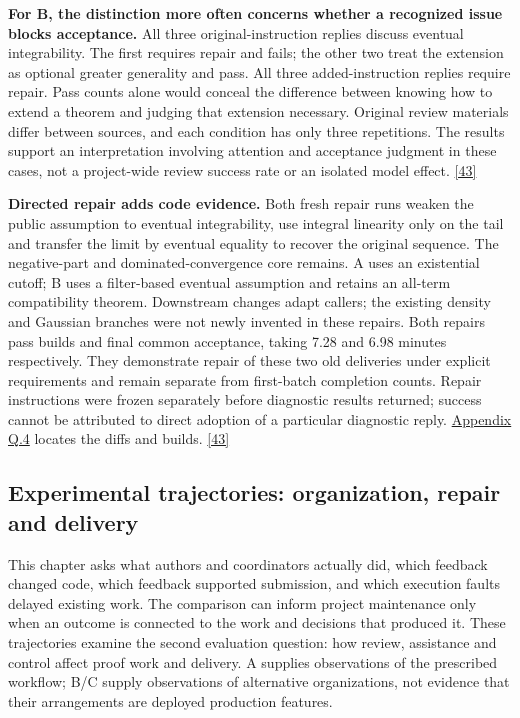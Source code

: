 \textbf{For B, the distinction more often concerns whether a recognized issue blocks acceptance.} All three original-instruction replies discuss eventual integrability. The first requires repair and fails; the other two treat the extension as optional greater generality and pass. All three added-instruction replies require repair. Pass counts alone would conceal the difference between knowing how to extend a theorem and judging that extension necessary. Original review materials differ between sources, and each condition has only three repetitions. The results support an interpretation involving attention and acceptance judgment in these cases, not a project-wide review success rate or an isolated model effect. \href{en.pdf\#ref-43}{\mbox{[43]}}

\textbf{Directed repair adds code evidence.} Both fresh repair runs weaken the public assumption to eventual integrability, use integral linearity only on the tail and transfer the limit by eventual equality to recover the original sequence. The negative-part and dominated-convergence core remains. A uses an existential cutoff; B uses a filter-based eventual assumption and retains an all-term compatibility theorem. Downstream changes adapt callers; the existing density and Gaussian branches were not newly invented in these repairs. Both repairs pass builds and final common acceptance, taking 7.28 and 6.98 minutes respectively. They demonstrate repair of these two old deliveries under explicit requirements and remain separate from first-batch completion counts. Repair instructions were frozen separately before diagnostic results returned; success cannot be attributed to direct adoption of a particular diagnostic reply. \href{en-appendix.pdf\#q4}{Appendix Q.4} locates the diffs and builds. \href{en.pdf\#ref-43}{\mbox{[43]}}

\subsection[Experimental trajectories: organization, repair and delivery]{\texorpdfstring{\protect\hypertarget{r2}{}Experimental trajectories: organization, repair and delivery}{Experimental trajectories: organization, repair and delivery}}
This chapter asks what authors and coordinators actually did, which feedback changed code, which feedback supported submission, and which execution faults delayed existing work. The comparison can inform project maintenance only when an outcome is connected to the work and decisions that produced it. These trajectories examine the second evaluation question: how review, assistance and control affect proof work and delivery. A supplies observations of the prescribed workflow; B/C supply observations of alternative organizations, not evidence that their arrangements are deployed production features.

